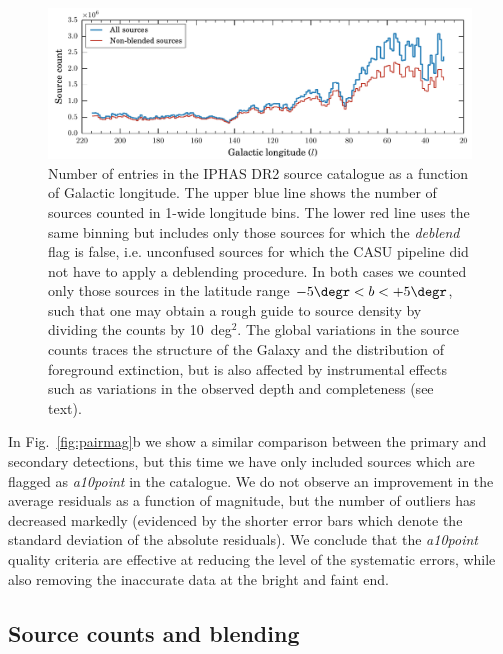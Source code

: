 \documentclass[a4paper,useAMS,usenatbib]{mn2e}
\begin{document}
\begin{figure}
    \vspace{2cm}
    \includegraphics[width=\textwidth]{figures/sourcecount/sourcecount.pdf} 
    \caption{Number of entries in the IPHAS DR2 source catalogue
    as a function of Galactic longitude.
    The upper blue line shows the number of sources
    counted in 1\degr-wide longitude bins.
    The lower red line uses the same binning
    but includes only those sources 
    for which the \emph{deblend} flag is {\sc false}, 
    i.e. unconfused sources for which the CASU pipeline
    did not have to apply a deblending procedure.
    In both cases we counted only those sources
    in the latitude range $-5\degr<b<+5\degr$,
    such that one may obtain a rough guide to source density
    by dividing the counts by 10~deg$^2$.
    The global variations in the source counts
    traces the structure of the Galaxy
    and the distribution of foreground extinction,
    but is also affected by instrumental effects
	such as variations in the observed depth
	and completeness (see text).
   }
    \label{fig:sourcecount}
\end{figure}

In Fig.~\ref{fig:pairmag}b we show 
a similar comparison between the primary and secondary detections,
but this time we have only included sources which are flagged
as \emph{a10point} in the catalogue.
We do not observe an improvement in the average residuals as a function of magnitude,
but the number of outliers has decreased markedly
(evidenced by the shorter error bars which denote the standard deviation of the absolute residuals).
We conclude that the \emph{a10point} quality criteria are effective
at reducing the level of the systematic errors,
while also removing the inaccurate data at the bright and faint end.


\subsection{Source counts and blending}
\label{sec:densities}
\end{document}
